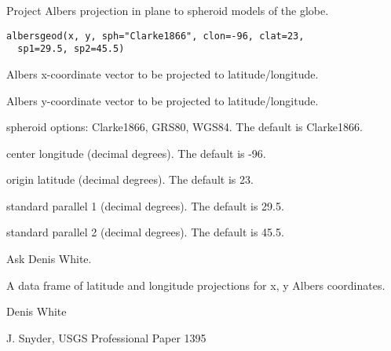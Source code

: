 \begin{Description}\relax
Project Albers projection in plane to spheroid models of the globe.
\end{Description}
\begin{Usage}
\begin{verbatim}
albersgeod(x, y, sph="Clarke1866", clon=-96, clat=23,
  sp1=29.5, sp2=45.5)
\end{verbatim}
\end{Usage}
\begin{Arguments}
\begin{ldescription}
\item[\code{x}] Albers x-coordinate vector to be projected to latitude/longitude.
\item[\code{y}] Albers y-coordinate vector to be projected to latitude/longitude.
\item[\code{sph}] spheroid options: Clarke1866, GRS80, WGS84.  The default is 
Clarke1866.
\item[\code{clon}] center longitude (decimal degrees).  The default is -96.
\item[\code{clat}] origin latitude (decimal degrees).  The default is 23.
\item[\code{sp1}] standard parallel 1 (decimal degrees).  The default is 29.5.
\item[\code{sp2}] standard parallel 2 (decimal degrees).  The default is 45.5.
\end{ldescription}
\end{Arguments}
\begin{Details}\relax
Ask Denis White.
\end{Details}
\begin{Value}
A data frame of latitude and longitude projections for x, y Albers coordinates.
\end{Value}
\begin{Author}\relax
Denis White 
\end{Author}
\begin{References}\relax
J. Snyder, USGS Professional Paper 1395
\end{References}

